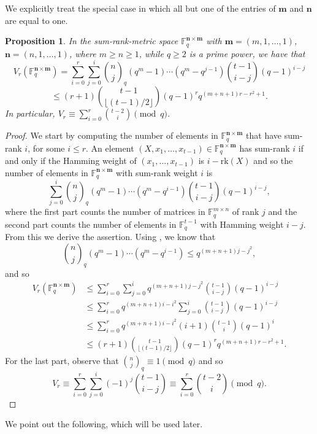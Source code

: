 \documentclass[a4paper]{article}
\newtheorem{proposition}[formula]{Proposition}
\newcommand{\F}{\mathbb{F}}
\newcommand{\Fq}{\F_q}
\newcommand{\bfn}{\mathbf {n}}
\newcommand{\bfm}{\mathbf {m}}
\newcommand{\spac}{\F^{\bfn\times\bfm}_q}
\begin{document}
We explicitly treat the special case in which all but one of the entries of $\mathbf{m}$ and $\mathbf{n}$ are equal to one.

\begin{proposition}\label{prop:boundvolume}
    In the sum-rank-metric space $\spac$ with $\bfm=(m,1,\dots,1)$, $\bfn=(n,1,\dots,1)$, where $m\geq n\geq1$, while $q\geq 2$ is a prime power, we have that
    \[ V_r(\Fq^{\bfn\times\bfm})= \sum_{i=0}^r\sum_{j=0}^i {n \choose j}_q (q^m-1)\cdots(q^m-q^{j-1}) {t-1\choose i-j}(q-1)^{i-j}\]
    \[\leq (r+1) {t-1 \choose \lfloor (t-1)/2\rfloor} (q-1)^r q^{(m+n+1)r-r^2+1}. \]
    In particular, $V_r \equiv \sum_{i=0}^r {t-2 \choose i}\pmod{q}$.
\end{proposition}

\begin{proof}
    We start by computing the number of elements in $\Fq^{\bfn\times\bfm}$ that have sum-rank $i$, for some $i\leq r$.
    An element $(X,x_1,\ldots,x_{t-1})\in \Fq^{\bfn\times\bfm}$ has sum-rank $i$ if and only if the Hamming weight of $(x_1,\ldots,x_{t-1})$ is $i-\mathrm{rk}(X)$ and so the number of elements in $\Fq^{\bfn\times\bfm}$ with sum-rank weight $i$ is 
    \[\sum_{j=0}^i {n \choose j}_q (q^m-1)\cdots(q^m-q^{i-1}) {t-1\choose i-j}(q-1)^{i-j}, \]
    where the first part counts the number of matrices in $\Fq^{m\times n}$ of rank $j$ and the second part counts the number of elements in $\F_q^{t-1}$ with Hamming weight $i-j$.
    From this we derive the assertion.
    Using \cite[Proposition 1]{loidreau2006properties}, we know that
    \[ {n \choose j}_q (q^m-1)\cdots(q^m-q^{i-1}) \leq q^{(m+n+1)j-j^2}, \]
    and so
    \begin{align*}
        V_r(\Fq^{\bfn\times\bfm})&\leq \sum_{i=0}^r\sum_{j=0}^i q^{(m+n+1)j-j^2} {t-1\choose i-j}(q-1)^{i-j} \\   
    & \leq \sum_{i=0}^r q^{(m+n+1)i-i^2} \sum_{j=0}^i {t-1\choose i-j}(q-1)^{i-j}\\
    &\leq \sum_{i=0}^r q^{(m+n+1)i-i^2} (i+1) {t-1 \choose i} (q-1)^i\\
   & \leq (r+1) {t-1 \choose \lfloor (t-1)/2\rfloor} (q-1)^r q^{(m+n+1)r-r^2+1}. 
    \end{align*}
    For the last part, observe that ${n \choose j}_q \equiv 1 \pmod{q}$ and so
    \[ V_r \equiv \sum_{i=0}^r \sum_{j=0}^i (-1)^j {t-1 \choose i-j} \equiv \sum_{i=0}^r {t-2 \choose i}\pmod{q}. \]
\end{proof}

We point out the following, which will be used later.
\end{document}

